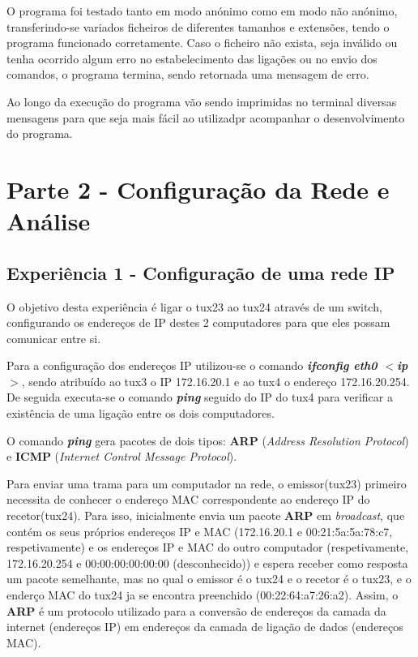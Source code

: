 \documentclass[11pt]{article}
\begin{document}
O programa foi testado tanto em modo anónimo como em modo não anónimo, transferindo-se variados ficheiros de diferentes tamanhos e extensões, tendo o programa funcionado corretamente. Caso o ficheiro não exista, seja inválido ou tenha ocorrido algum erro no estabelecimento das ligações ou no envio dos comandos, o programa termina, sendo retornada uma mensagem de erro. 

Ao longo da execução do programa vão sendo imprimidas no terminal diversas mensagens para que seja mais fácil ao utilizadpr acompanhar o desenvolvimento do programa.

\section{Parte 2 - Configuração da Rede e Análise} 

\subsection{Experiência 1 - Configuração de uma rede IP}

O objetivo desta experiência é ligar o tux23 ao tux24 através de um switch, configurando os endereços de IP destes 2 computadores para que eles possam comunicar entre si.

Para a configuração dos endereços IP utilizou-se o comando \textit{\textbf{ifconfig eth0 $<$ip$>$}}, sendo atribuído ao tux3 o IP 172.16.20.1 e ao tux4 o endereço 172.16.20.254. De seguida executa-se o comando \textit{\textbf{ping}} seguido do IP do tux4 para verificar a existência de uma ligação entre os dois computadores. 

O comando \textit{\textbf{ping}} gera pacotes de dois tipos: \textbf{ARP} (\textit{Address Resolution Protocol}) e \textbf{ICMP} (\textit{Internet Control Message Protocol}).

Para enviar uma trama para um computador na rede, o emissor(tux23) primeiro necessita de conhecer o endereço MAC correspondente ao endereço IP do recetor(tux24). Para isso, inicialmente envia um pacote \textbf{ARP} em \textit{broadcast}, que contém os seus próprios endereços IP e MAC (172.16.20.1 e 00:21:5a:5a:78:c7, respetivamente) e os endereços IP e MAC do outro computador (respetivamente, 172.16.20.254 e 00:00:00:00:00:00 (desconhecido)) e espera receber como resposta um pacote semelhante, mas no qual o emissor é o tux24 e o recetor é o tux23, e o enderço MAC do tux24 ja se encontra preenchido (00:22:64:a7:26:a2). Assim, o \textbf{ARP} é um protocolo utilizado para a conversão de endereços da camada da internet (endereços IP) em endereços da camada de ligação de dados (endereços MAC). 
\end{document}

